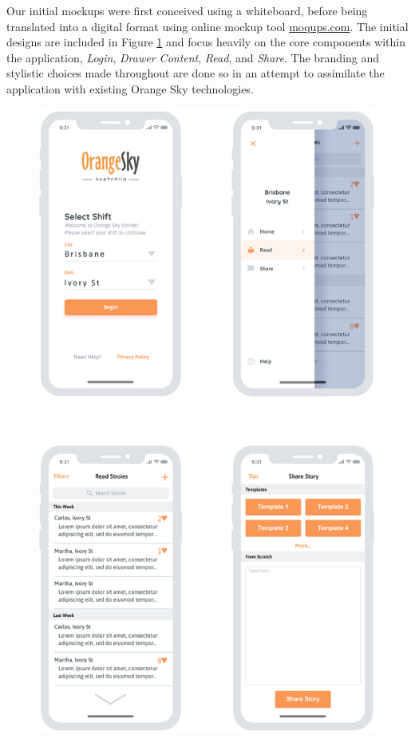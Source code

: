 Our initial mockups were first conceived using a whiteboard, before being translated into a digital format using online mockup tool \url{moqups.com}. The initial designs are included in Figure \ref{initialdesigns} and focus heavily on the core components within the application, \emph{Login}, \emph{Drawer Content}, \emph{Read}, and \emph{Share}. The branding and stylistic choices made throughout are done so in an attempt to assimilate the application with existing Orange Sky technologies.

\clearpage

\begin{figure}[ht!]
    \centering
    \includegraphics[scale=0.3]{assets/designs/20200816-mockups.png}
    \caption{}
    \label{initialdesigns}
\end{figure}

